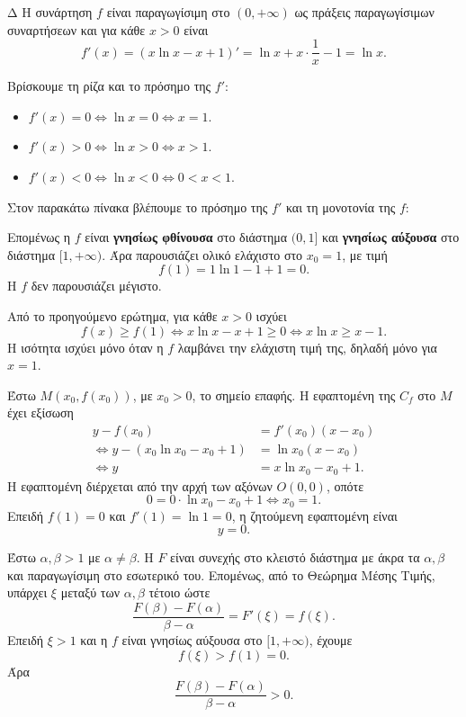\begin{thema}{Δ}
Η συνάρτηση $f$ είναι παραγωγίσιμη στο $(0,+\infty)$ ως πράξεις παραγωγίσιμων συναρτήσεων και για κάθε $x>0$ είναι
\[
f'(x)=(x\ln x-x+1)'=\ln x+x\cdot\frac{1}{x}-1=\ln x.
\]
\begin{erwthma}
\item Βρίσκουμε τη ρίζα και το πρόσημο της $f'$:
\begin{itemize}
\item $f'(x)=0\Leftrightarrow \ln x=0\Leftrightarrow x=1$.
\item $f'(x)>0\Leftrightarrow \ln x>0\Leftrightarrow x>1$.
\item $f'(x)<0\Leftrightarrow \ln x<0\Leftrightarrow 0<x<1$.
\end{itemize}
Στον παρακάτω πίνακα βλέπουμε το πρόσημο της $f'$ και τη μονοτονία της $f$:
\begin{center}
\end{center}

Επομένως η $f$ είναι \textbf{γνησίως φθίνουσα} στο διάστημα $(0,1]$ και \textbf{γνησίως αύξουσα} στο διάστημα $[1,+\infty)$. Άρα παρουσιάζει ολικό ελάχιστο στο $x_0=1$, με τιμή
\[
f(1)=1\ln 1-1+1=0.
\]
Η $f$ δεν παρουσιάζει μέγιστο.

\item Από το προηγούμενο ερώτημα, για κάθε $x>0$ ισχύει
\[
f(x)\geq f(1)\Leftrightarrow x\ln x-x+1\geq 0
\Leftrightarrow x\ln x\geq x-1.
\]
Η ισότητα ισχύει μόνο όταν η $f$ λαμβάνει την ελάχιστη τιμή της, δηλαδή μόνο για $x=1$.

\item Έστω $M(x_0,f(x_0))$, με $x_0>0$, το σημείο επαφής. Η εφαπτομένη της $C_f$ στο $M$ έχει εξίσωση
\begin{align*}
y-f(x_0)&=f'(x_0)(x-x_0)\\
\Leftrightarrow y-\left(x_0\ln x_0-x_0+1\right)&=\ln x_0(x-x_0)\\
\Leftrightarrow y&=x\ln x_0-x_0+1.
\end{align*}
Η εφαπτομένη διέρχεται από την αρχή των αξόνων $O(0,0)$, οπότε
\[
0=0\cdot\ln x_0-x_0+1\Leftrightarrow x_0=1.
\]
Επειδή $f(1)=0$ και $f'(1)=\ln 1=0$, η ζητούμενη εφαπτομένη είναι
\[
{y=0}.
\]

\item Έστω $\alpha,\beta>1$ με $\alpha\neq\beta$. Η $F$ είναι συνεχής στο κλειστό διάστημα με άκρα τα $\alpha,\beta$ και παραγωγίσιμη στο εσωτερικό του. Επομένως, από το Θεώρημα Μέσης Τιμής, υπάρχει $\xi$ μεταξύ των $\alpha,\beta$ τέτοιο ώστε
\[
\frac{F(\beta)-F(\alpha)}{\beta-\alpha}=F'(\xi)=f(\xi).
\]
Επειδή $\xi>1$ και η $f$ είναι γνησίως αύξουσα στο $[1,+\infty)$, έχουμε
\[
f(\xi)>f(1)=0.
\]
Άρα
\[
{\frac{F(\beta)-F(\alpha)}{\beta-\alpha}>0}.
\]
\end{erwthma}
\end{thema}

